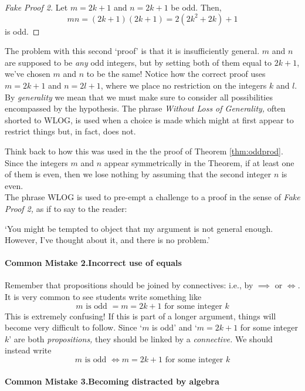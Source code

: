 \begin{proof}[Fake Proof 2]
Let $m=2k+1$ and $n=2k+1$ be odd. Then,
\[mn=(2k+1)(2k+1)=2(2k^2+2k)+1\]
is odd.
\end{proof}

 The problem with this second `proof' is that it is insufficiently general. $m$ and $n$ are supposed to be \emph{any} odd integers, but by setting both of them equal to $2k+1$, we've chosen $m$ and $n$ to be the same! Notice how the correct proof uses $m=2k+1$ and $n=2l+1$, where we place no restriction on the integers $k$ and $l$.\\


 By \emph{generality} we mean that we must make sure to consider all possibilities encompassed by the hypothesis. The phrase \emph{Without Loss of Generality,} often shorted to WLOG, is used when a choice is made which might at first appear to restrict things but, in fact, does not.

Think back to how this was used in the the proof of Theorem \ref{thm:oddprod}. Since the integers $m$ and $n$ appear symmetrically in the Theorem, if at least one of them is even, then we lose nothing by assuming that the second integer $n$ is even.\\

The phrase WLOG is used to pre-empt a challenge to a proof in the sense of \emph{Fake Proof 2,} as if to say to the reader:
\begin{center}
`You might be tempted to object that my argument is not general enough. However, I've thought about it, and there is no problem.'\\
\end{center}

\paragraph{Common Mistake 2.\quad Incorrect use of equals}

Remember that propositions should be joined by connectives: i.e., by $\implies$ or $\iff$. It is very common to see students write something like
\[\text{$m$ is odd $=m=2k+1$ for some integer $k$}\]
This is extremely confusing! If this is part of a longer argument, things will become very difficult to follow. Since `$m$ is odd' and `$m=2k+1$ for some integer $k$' are both \emph{propositions,} they should be linked by a \emph{connective.} We should instead write
\[\text{$m$ is odd $\iff m=2k+1$ for some integer $k$}\]

\paragraph{Common Mistake 3.\quad Becoming distracted by algebra}

